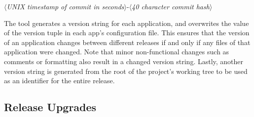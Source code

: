 \begin{center}
  $\langle$\emph{UNIX timestamp of commit in seconds}$\rangle$-$\langle$\emph{40 character commit hash}$\rangle$
\end{center}


The tool generates a version string for each application, and overwrites the value of the version tuple in each app's configuration file. This ensures that the version of an application changes between different releases if and only if any files of that application were changed. Note that minor non-functional changes such as comments or formatting also result in a changed version string. Lastly, another version string is generated from the root of the project's working tree to be used as an identifier for the entire release.

\subsection{Release Upgrades}

